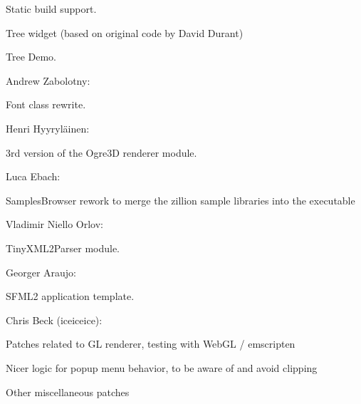 \begin{DoxyItemize}
\begin{DoxyItemize}
\item Static build support.
\item Tree widget (based on original code by David Durant)
\item Tree Demo.
\end{DoxyItemize}
\item Andrew Zabolotny\+:
\begin{DoxyItemize}
\item Font class rewrite.
\end{DoxyItemize}
\item Henri Hyyryläinen\+:
\begin{DoxyItemize}
\item 3rd version of the Ogre3D renderer module.
\end{DoxyItemize}
\item Luca Ebach\+:
\begin{DoxyItemize}
\item Samples\+Browser rework to merge the \textquotesingle{}zillion\textquotesingle{} sample libraries into the executable
\end{DoxyItemize}
\item Vladimir \textquotesingle{}Niello\textquotesingle{} Orlov\+:
\begin{DoxyItemize}
\item Tiny\+X\+M\+L2\+Parser module.
\end{DoxyItemize}
\item Georger Araujo\+:
\begin{DoxyItemize}
\item S\+F\+M\+L2 application template.
\end{DoxyItemize}
\item Chris Beck (iceiceice)\+:
\begin{DoxyItemize}
\item Patches related to GL renderer, testing with Web\+GL / emscripten
\item Nicer logic for popup menu behavior, to be aware of and avoid clipping
\item Other miscellaneous patches
\end{DoxyItemize}
\end{DoxyItemize}

